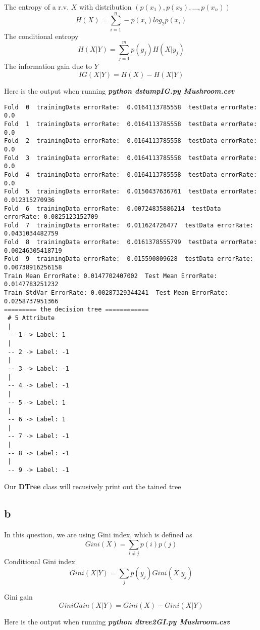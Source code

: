 \documentclass[12pt]{amsart}
\begin{document}
The entropy of a r.v. $X$ with distribution $(p(x_1), p(x_2), \ldots, p(x_n))$ 
$$
	H(X) = \sum_{i=1}^n -p(x_i) log_2 p(x_i)
$$ 
The conditional entropy
$$
	H(X|Y) = \sum_{j=1}^m p(y_j) H(X|y_j)
$$
The information gain due to $Y$
$$
	IG(X|Y) = H(X) - H(X|Y)
$$

Here is the output when running \textit{\textbf{python dstumpIG.py Mushroom.csv}}


\begin{verbatim}
Fold  0  trainingData errorRate:  0.0164113785558  testData errorRate: 0.0
Fold  1  trainingData errorRate:  0.0164113785558  testData errorRate: 0.0
Fold  2  trainingData errorRate:  0.0164113785558  testData errorRate: 0.0
Fold  3  trainingData errorRate:  0.0164113785558  testData errorRate: 0.0
Fold  4  trainingData errorRate:  0.0164113785558  testData errorRate: 0.0
Fold  5  trainingData errorRate:  0.0150437636761  testData errorRate: 0.012315270936
Fold  6  trainingData errorRate:  0.00724835886214  testData errorRate: 0.0825123152709
Fold  7  trainingData errorRate:  0.011624726477  testData errorRate: 0.0431034482759
Fold  8  trainingData errorRate:  0.0161378555799  testData errorRate: 0.00246305418719
Fold  9  trainingData errorRate:  0.015590809628  testData errorRate: 0.00738916256158
Train Mean ErrorRate: 0.0147702407002  Test Mean ErrorRate: 0.0147783251232
Train StdVar ErrorRate: 0.00287329344241  Test Mean ErrorRate: 0.0258737951366
========= the decision tree ============
 # 5 Attribute
 |
 -- 1 -> Label: 1
 |
 -- 2 -> Label: -1
 |
 -- 3 -> Label: -1
 |
 -- 4 -> Label: -1
 |
 -- 5 -> Label: 1
 |
 -- 6 -> Label: 1
 |
 -- 7 -> Label: -1
 |
 -- 8 -> Label: -1
 |
 -- 9 -> Label: -1
\end{verbatim}
Our \textbf{DTree} class will recusively print out the tained tree

\subsection*{b}
In this question, we are using Gini index, which is defined as
$$
	Gini(X) = \sum_{i\neq j} p(i) p(j)
$$
Conditional Gini index
$$
	Gini(X|Y) = \sum_j p(y_j) Gini(X|y_j)
$$

Gini gain
$$
	GiniGain(X|Y) = Gini(X) - Gini(X|Y)
$$

Here is the output when running \textit{\textbf{python dtree2GI.py Mushroom.csv}}
\end{document}

